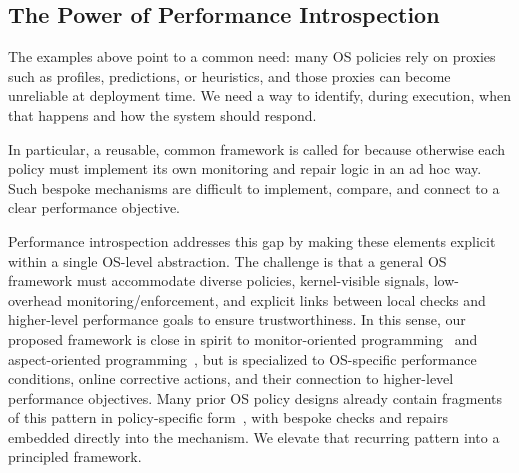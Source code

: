\subsection{The Power of Performance Introspection}


The examples above point to a common need: many OS policies rely on proxies such as profiles, predictions, or heuristics, and those proxies can become unreliable at deployment time. We need a way to identify, during execution, when that happens and how the system should respond.

In particular, a reusable, common framework is called for because otherwise each policy must implement its own monitoring and repair logic in an ad hoc way. Such bespoke mechanisms are difficult to implement, compare, and connect to a clear performance objective.


Performance introspection addresses this gap by making these elements explicit within a single OS-level abstraction. The challenge is that a general OS framework must accommodate diverse policies, kernel-visible signals, low-overhead monitoring/enforcement, and explicit links between local checks and higher-level performance goals to ensure trustworthiness. In this sense, our proposed framework is close in spirit to monitor-oriented programming~\cite{oopsla07} and aspect-oriented programming~\cite{kiczales1997aspect}, but is specialized to OS-specific performance conditions, online corrective actions, and their connection to higher-level performance objectives. Many prior OS policy designs already contain fragments of this pattern in policy-specific form~\cite{},  with bespoke checks and repairs embedded directly into the mechanism. We elevate that recurring pattern into a principled framework.


 


